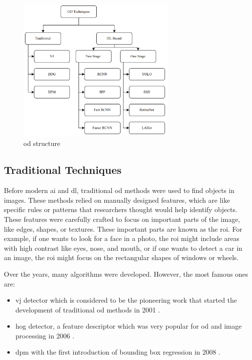 \begin{figure}[ht]
    \centering
    \includegraphics[width=0.7\textwidth]{Figures/OD_Mindmape.PNG} 
    \caption{\gls{od} structure \cite{oD_Review}}
    \label{OD_Mindmap}
\end{figure}

\subsection{Traditional Techniques}
Before modern \gls{ai} and \gls{dl}, traditional \gls{od} methods were used to find objects in images. These methods relied on manually designed features, which are like specific rules or patterns that researchers thought would help identify objects. These features were carefully crafted to focus on important parts of the image, like edges, shapes, or textures. These important parts are known as the \gls{roi}. For example, if one wants to look for a face in a photo, the \gls{roi} might include areas with high contrast like eyes, nose, and mouth, or if one wants to detect a car in an image, the \gls{roi} might focus on the rectangular shapes of windows or wheels.

Over the years, many algorithms were developed. However, the most famous ones are:
\begin{itemize}
    \item \gls{vj} detector which is considered to be the pioneering work that started the development of traditional \gls{od} methods in 2001 \cite{Fam_Traditional_detectors}.
    \item \gls{hog} detector, a feature descriptor which was very popular for \gls{od} and image processing in 2006 \cite{Fam_Traditional_detectors}.
    \item \gls{dpm} with the first introduction of bounding box regression in 2008 \cite{Fam_Traditional_detectors}.
\end{itemize}

